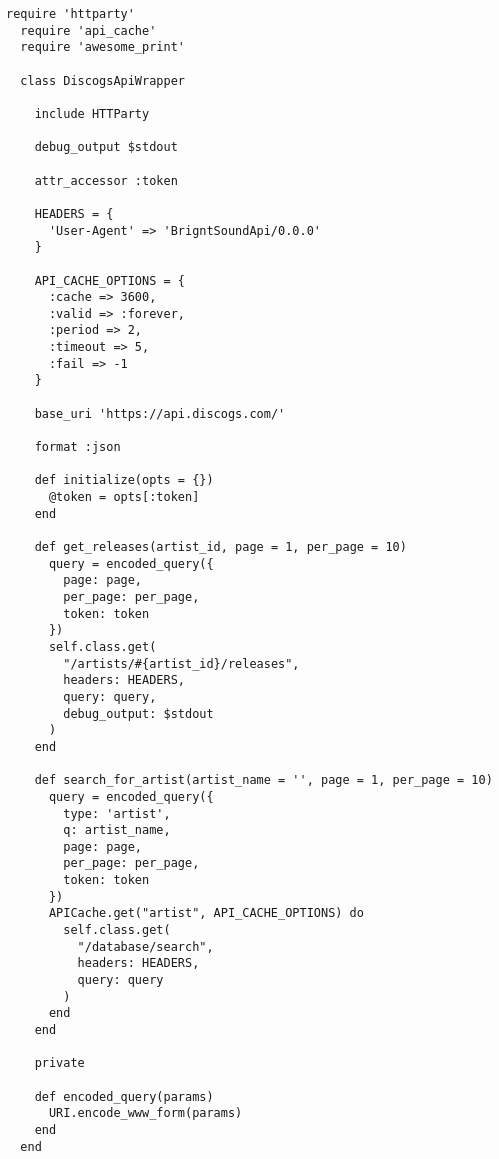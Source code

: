 \begin{lstlisting}[style=fsharpstyle,caption={Пример получения артистов по определённым параметрам}, label=lst:arch_and_mod:mvc:controller:discogs_wrapper_example]
  require 'httparty'
  require 'api_cache'
  require 'awesome_print'

  class DiscogsApiWrapper

    include HTTParty

    debug_output $stdout

    attr_accessor :token

    HEADERS = {
      'User-Agent' => 'BrigntSoundApi/0.0.0'
    }

    API_CACHE_OPTIONS = {
      :cache => 3600,
      :valid => :forever,
      :period => 2,
      :timeout => 5,
      :fail => -1
    }

    base_uri 'https://api.discogs.com/'

    format :json

    def initialize(opts = {})
      @token = opts[:token]
    end

    def get_releases(artist_id, page = 1, per_page = 10)
      query = encoded_query({
        page: page,
        per_page: per_page,
        token: token
      })
      self.class.get(
        "/artists/#{artist_id}/releases",
        headers: HEADERS,
        query: query,
        debug_output: $stdout
      )
    end

    def search_for_artist(artist_name = '', page = 1, per_page = 10)
      query = encoded_query({
        type: 'artist',
        q: artist_name,
        page: page,
        per_page: per_page,
        token: token
      })
      APICache.get("artist", API_CACHE_OPTIONS) do
        self.class.get(
          "/database/search",
          headers: HEADERS,
          query: query
        )
      end
    end

    private

    def encoded_query(params)
      URI.encode_www_form(params)
    end
  end

\end{lstlisting}
